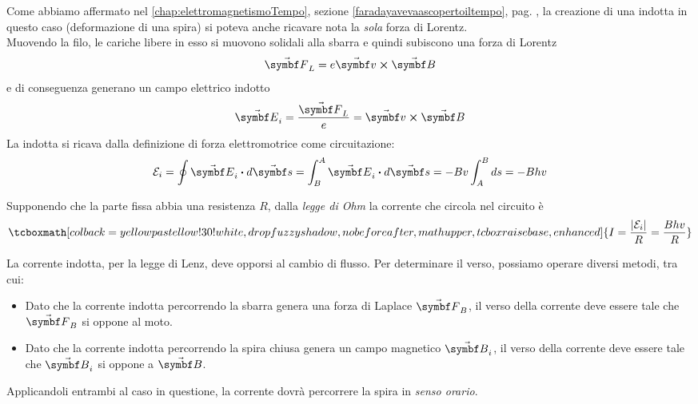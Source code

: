 \begin{observe}
	Come abbiamo affermato nel \autoref{chap:elettromagnetismoTempo}, sezione \ref{faradayavevaascopertoiltempo}, pag. \pageref{faradayavevaascopertoiltempo}, la creazione di una \fem indotta in questo caso (deformazione di una spira) si poteva anche ricavare nota la \textit{sola} forza di Lorentz.\\
	Muovendo la filo, le cariche libere in esso si muovono solidali alla sbarra e quindi subiscono una forza di Lorentz
	\begin{equation*}
		\vba{F}_L=e\vba{v}\cross\vba{B}
	\end{equation*}
	e di conseguenza generano un campo elettrico indotto
	\begin{equation*}
		\vba{E}_i=\frac{\vba{F}_L}{e}=\vba{v}\cross\vba{B}
	\end{equation*}
	La \fem indotta si ricava dalla definizione di forza elettromotrice come circuitazione:
	\begin{equation*}
		\mathcal{E}_i=\oint \vba{E}_i\vdot d\vba{s}=\int_{B}^{A}\vba{E}_i\vdot d\vba{s}=-Bv\int_{A}^{B}ds=-Bhv
	\end{equation*}
\end{observe}
Supponendo che la parte fissa abbia una resistenza $R$, dalla \textit{legge di Ohm} la corrente che circola nel circuito è
\begin{equation}
	\tcboxmath[colback=yellowpastellow!30!white,drop fuzzy shadow, nobeforeafter, math upper, tcbox raise base, enhanced]{I=\frac{\abs{\mathcal{E}_i}}{R}=\frac{Bhv}{R}}
\end{equation}
\begin{observe}
	La corrente indotta, per la legge di Lenz, deve opporsi al cambio di flusso. Per determinare il verso, possiamo operare diversi metodi, tra cui:
	\begin{itemize}
		\item Dato che la corrente indotta percorrendo la sbarra genera una forza di Laplace $\vba{F}_B$, il verso della corrente deve essere tale che $\vba{F}_B$ si oppone al moto.
		\item Dato che la corrente indotta percorrendo la spira chiusa genera un campo magnetico $\vba{B}_i$, il verso della corrente deve essere tale che $\vba{B}_i$ si oppone a $\vba{B}$.
	\end{itemize}
	Applicandoli entrambi al caso in questione, la corrente dovrà percorrere la spira in \textit{senso orario}.
\end{observe}
